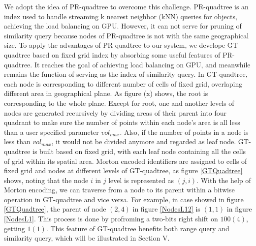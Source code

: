 \documentclass[conference]{IEEEtran}
\begin{document}
We adopt the idea of PR-quadtree\cite{DBLP:conf/gis/LettichOS15} to overcome this challenge. PR-quadtree is an index used to handle streaming k nearest neighbor (kNN) queries for objects, achieving the load balancing on GPU. However, it can not serve for pruning of similarity query because nodes of PR-quadtree is not with the same geographical size. To apply the advantages of PR-quadtree to our system, we develope GT-quadtree based on fixed grid index by absorbing some useful features of PR-quadtree. It reaches the goal of achieving load balancing on GPU, and meanwhile remains the function of serving as the index of similarity query. In GT-quadtree, each node is corresponding to different number of cells of fixed grid, overlaping different area in geographical plane. As figure (x) shows, %
%
%
the root is corresponding to the whole plane. Except for root, one and another levels of nodes are generated recursively by dividing areas of their parent into four quadrant to make sure the number of points within each node's area is all less than a user specified parameter $vol_{max}$. Also, if the number of points in a node is less than $vol_{max}$, it would not be divided anymore and regarded as leaf node. GT-quadtree is built based on fixed grid, with each leaf node containing all the cells of grid within its spatial area. Morton encoded identifiers are assigned to cells of fixed grid and nodes at different levels of GT-quadtree, as figure \ref{GTQuadtree} shows, noting that the node $i$ in $j$ level is represented as $(j,i)$. With the help of Morton encoding, we can traverse from a node to its parent within a bitwise operation in GT-quadtree and vice versa. For example, in case showed in figure \ref{GTQuadtree}, the parent of node $(2,4)$ in figure \ref{NodesL12} is $(1,1)$ in figure \ref{NodesL1}. This process is done by profroming a two-bits right shift on $100(4)$, getting $1(1)$. This feature of GT-quadtree benefits both range query and similarity query, which will be illustrated in Section V.

\end{document}
